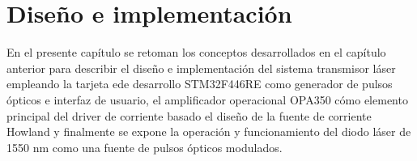 

\chapter{Diseño e implementación}

En el presente capítulo se retoman los conceptos desarrollados en el capítulo anterior para describir el diseño e implementación del sistema transmisor láser empleando la tarjeta ede desarrollo STM32F446RE como generador de pulsos ópticos e interfaz de usuario, el amplificador operacional OPA350 cómo elemento principal del driver de corriente basado el diseño de la fuente de corriente Howland y finalmente se expone la operación y funcionamiento del diodo láser de 1550 nm como una fuente de pulsos ópticos modulados. 



















